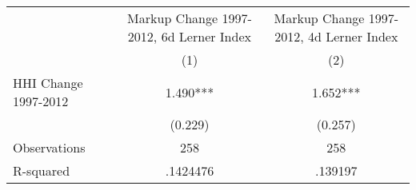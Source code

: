 {
\def\sym#1{\ifmmode^{#1}\else\(^{#1}\)\fi}
\begin{tabular}{l*{2}{c}}
\hline\hline
                    &Markup Change 1997-2012, 6d Lerner Index   &Markup Change 1997-2012, 4d Lerner Index   \\
                    &\multicolumn{1}{c}{(1)}   &\multicolumn{1}{c}{(2)}   \\
\hline
HHI Change 1997-2012&       1.490***&       1.652***\\
                    &     (0.229)   &     (0.257)   \\
\hline
Observations        &         258   &         258   \\
R-squared           &    .1424476   &     .139197   \\
\hline\hline
\end{tabular}
}
